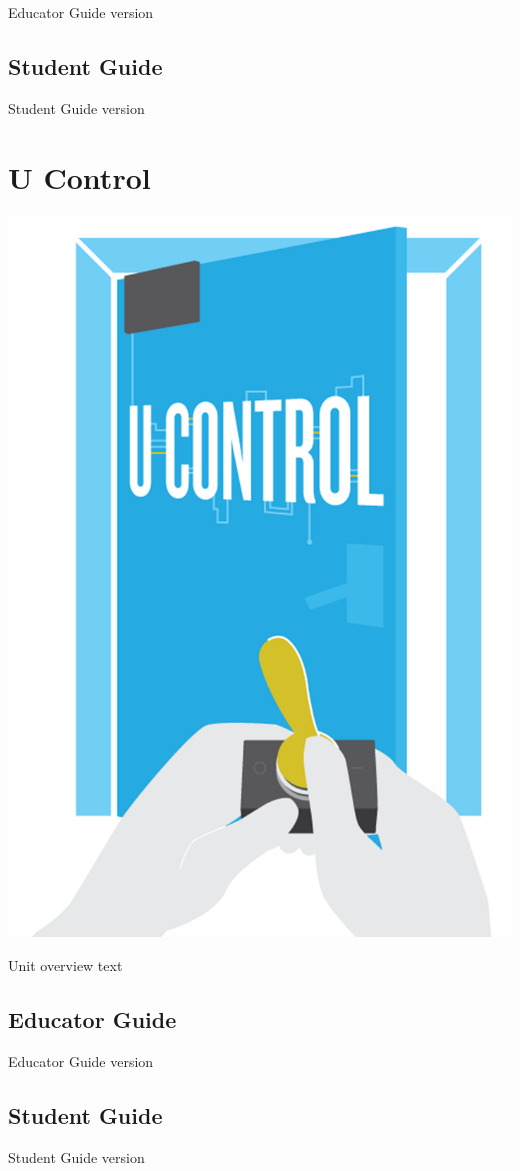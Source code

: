 \documentclass[]{book}
\begin{document}
Educator Guide version

\section{Student Guide}\label{student-guide-6}

Student Guide version

\chapter{U Control}\label{u-control}

\begin{center}\includegraphics[width=0.5\linewidth]{img/uControl} \end{center}

Unit overview text

\section{Educator Guide}\label{educator-guide-7}

Educator Guide version

\section{Student Guide}\label{student-guide-7}

Student Guide version


\end{document}
